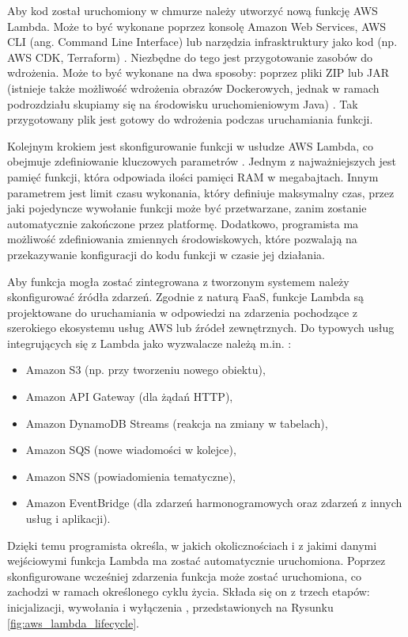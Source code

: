 Aby kod został uruchomiony w chmurze należy utworzyć nową funkcję AWS Lambda.
Może to być wykonane poprzez konsolę Amazon Web Services, AWS CLI (ang. Command Line Interface) lub narzędzia infrasktruktury jako kod (np. AWS CDK, Terraform) \cite{awsLambdaDocs}.
Niezbędne do tego jest przygotowanie zasobów do wdrożenia.
Może to być wykonane na dwa sposoby: poprzez pliki ZIP lub JAR (istnieje także możliwość wdrożenia obrazów Dockerowych, jednak w ramach podrozdziału skupiamy się na środowisku uruchomieniowym Java) \cite{awsLambdaDocs}.
Tak przygotowany plik jest gotowy do wdrożenia podczas uruchamiania funkcji.

Kolejnym krokiem jest skonfigurowanie funkcji w usłudze AWS Lambda, co obejmuje zdefiniowanie kluczowych parametrów \cite{awsLambdaDocs}.
Jednym z najważniejszych jest pamięć funkcji, która odpowiada ilości pamięci RAM w megabajtach.
Innym parametrem jest limit czasu wykonania, który definiuje maksymalny czas, przez jaki pojedyncze wywołanie funkcji może być przetwarzane, zanim zostanie automatycznie zakończone przez platformę. 
Dodatkowo, programista ma możliwość zdefiniowania zmiennych środowiskowych, które pozwalają na przekazywanie konfiguracji do kodu funkcji w czasie jej działania.

Aby funkcja mogła zostać zintegrowana z tworzonym systemem należy skonfigurować źródła zdarzeń.
Zgodnie z naturą FaaS, funkcje Lambda są projektowane do uruchamiania w odpowiedzi na zdarzenia pochodzące z szerokiego ekosystemu usług AWS lub źródeł zewnętrznych.
Do typowych usług integrujących się z Lambda jako wyzwalacze należą m.in. \cite{awsLambdaDocs}:
\begin{itemize}
    \item Amazon S3 (np. przy tworzeniu nowego obiektu),
    \item Amazon API Gateway (dla żądań HTTP),
    \item Amazon DynamoDB Streams (reakcja na zmiany w tabelach),
    \item Amazon SQS (nowe wiadomości w kolejce),
    \item Amazon SNS (powiadomienia tematyczne),
    \item Amazon EventBridge (dla zdarzeń harmonogramowych oraz zdarzeń z innych usług i aplikacji).
\end{itemize}
Dzięki temu programista określa, w jakich okolicznościach i z jakimi danymi wejściowymi funkcja Lambda ma zostać automatycznie uruchomiona.
Poprzez skonfigurowane wcześniej zdarzenia funkcja może zostać uruchomiona, co zachodzi w ramach określonego cyklu życia.
Składa się on z trzech etapów: inicjalizacji, wywołania i wyłączenia \cite{awsLambdaDocs}, przedstawionych na Rysunku \ref{fig:aws_lambda_lifecycle}.

